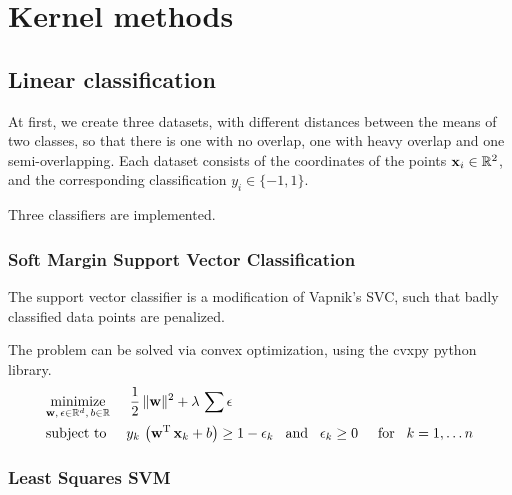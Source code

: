 \section{Kernel methods}

\subsection{Linear classification}

At first, we create three datasets, with different distances between
the means of two classes, so that there is one with no overlap,
one with heavy overlap and one semi-overlapping.
Each dataset consists of the coordinates of the points $\boldsymbol{\mathrm{x}}_i\in\mathbb{R}^2$,
and the corresponding classification $y_i\in\{-1, 1\}$.

Three classifiers are implemented.

\subsubsection{Soft Margin Support Vector Classification}


The support vector classifier is a modification of Vapnik's SVC, such that
badly classified data points are penalized.

The problem can be solved via convex optimization, using the cvxpy python library.
\begin{equation}
\begin{split}
	&\underset{\boldsymbol{\mathrm{w}},\,\epsilon\in\mathbb{R}^d,\,b\in\mathbb{R}}{\operatorname{minimize}}\hspace{5mm}
		\frac{1}{2}\,\lVert\boldsymbol{\mathrm{w}}\rVert^2 + \lambda\,\sum\epsilon\\
	&\text{subject to}\hspace{5mm}
		y_k\,\left(\boldsymbol{\mathrm{w}}\textsuperscript{T}\,\boldsymbol{\mathrm{x}}_k + b\right)\geq1-\epsilon_k\hspace{3mm}\text{and}\hspace{3mm}\epsilon_k\geq0\hspace{5mm}\text{for}\hspace{3mm} k=1,\dots n
\end{split}
\end{equation}

\subsubsection{Least Squares SVM}

